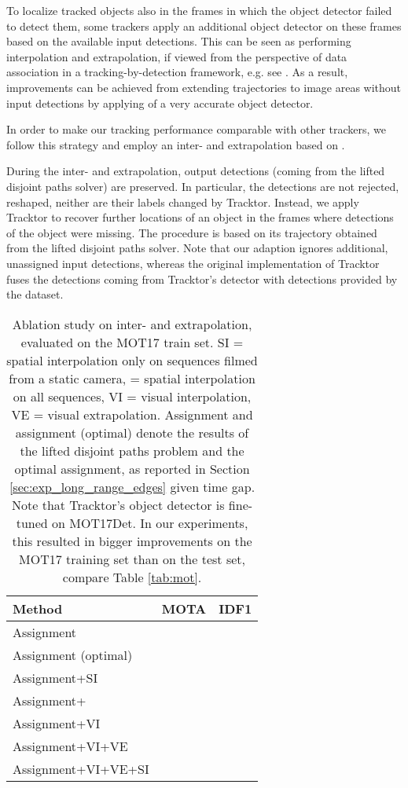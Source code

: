 \documentclass{article}
\begin{document}
To localize tracked objects also in the frames in which the object detector failed to detect them, some trackers apply an additional object detector on these frames based on the available input detections. This can be seen as performing interpolation and extrapolation, if viewed from the perspective of data association in a tracking-by-detection framework, e.g. see \cite{bergmann2019tracking}. 
As a result, improvements can be achieved from extending trajectories  to image areas without input detections by applying of a very accurate object detector.

In order to make our tracking performance comparable with other trackers, we follow this strategy and employ an inter- and extrapolation based on \cite{bergmann2019tracking}. 

During the inter- and extrapolation, output detections (coming from the lifted disjoint paths solver) are preserved.
In particular, the detections are not rejected, reshaped, neither are their labels changed by Tracktor. Instead, we apply Tracktor to recover further locations of an object 
in the frames where detections of the object were missing. The procedure is based on its trajectory obtained from the lifted disjoint paths solver.
Note that our adaption ignores additional, unassigned input detections, whereas the original implementation  \cite{bergmann2019tracking} of Tracktor fuses the detections coming from Tracktor's detector with detections provided by the dataset.

\begin{table}[hbt]
\begin{center}
\begin{tabular}{lcc}
\toprule Method & MOTA & IDF1  \\ \hline
Assignment &  &   \\
Assignment (optimal) &  &   \\
Assignment+SI &  &   \\
Assignment+ &  &   \\
Assignment+VI &  &   \\
Assignment+VI+VE &  &   \\
Assignment+VI+VE+SI &  &   \\
\bottomrule
\end{tabular}
\end{center}
\caption{Ablation study on inter- and extrapolation, evaluated on the MOT17 train set. SI = spatial interpolation only on sequences filmed from a static camera,  = spatial interpolation on all sequences, VI = visual interpolation, VE = visual extrapolation. Assignment and assignment (optimal) denote the results of the lifted disjoint paths problem and the optimal assignment, as reported in Section \ref{sec:exp_long_range_edges} given   time gap. Note that Tracktor's object detector is fine-tuned on MOT17Det. In our experiments, this resulted in bigger improvements on the MOT17 training set than on the test set, compare Table \ref{tab:mot}.
} 
\label{tab:tracking_ablation}
\end{table}
\end{document}
